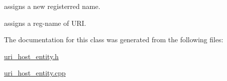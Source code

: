 assigns a new registerred name. 

assigns a reg-\/name of U\-R\-I. 

The documentation for this class was generated from the following files\-:\begin{DoxyCompactItemize}
\item 
\hyperlink{uri__host__entity_8h}{uri\-\_\-host\-\_\-entity.\-h}\item 
\hyperlink{uri__host__entity_8cpp}{uri\-\_\-host\-\_\-entity.\-cpp}\end{DoxyCompactItemize}
